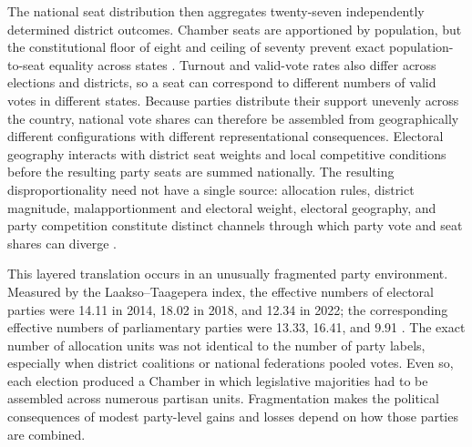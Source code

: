 \documentclass[11pt]{article}
\begin{document}
The national seat distribution then aggregates twenty-seven independently determined district outcomes. Chamber seats are apportioned by population, but the constitutional floor of eight and ceiling of seventy prevent exact population-to-seat equality across states \parencite{samuelsSnyder2001value,brasil1993lc78}. Turnout and valid-vote rates also differ across elections and districts, so a seat can correspond to different numbers of valid votes in different states. Because parties distribute their support unevenly across the country, national vote shares can therefore be assembled from geographically different configurations with different representational consequences. Electoral geography interacts with district seat weights and local competitive conditions before the resulting party seats are summed nationally. The resulting disproportionality need not have a single source: allocation rules, district magnitude, malapportionment and electoral weight, electoral geography, and party competition constitute distinct channels through which party vote and seat shares can diverge \parencite{bochsler2026winners}.

This layered translation occurs in an unusually fragmented party environment. Measured by the Laakso--Taagepera index, the effective numbers of electoral parties were 14.11 in 2014, 18.02 in 2018, and 12.34 in 2022; the corresponding effective numbers of parliamentary parties were 13.33, 16.41, and 9.91 \parencite{laakso1979effective}. The exact number of allocation units was not identical to the number of party labels, especially when district coalitions or national federations pooled votes. Even so, each election produced a Chamber in which legislative majorities had to be assembled across numerous partisan units. Fragmentation makes the political consequences of modest party-level gains and losses depend on how those parties are combined.

\end{document}
